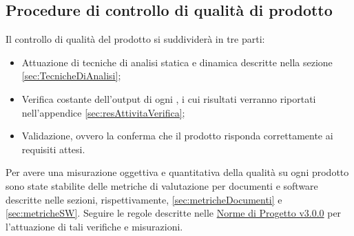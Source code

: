 \documentclass{scalatekids-article}
\begin{document}
\subsection{Procedure di controllo di qualità di prodotto}
Il controllo di qualità del prodotto si suddividerà in tre parti:
\begin{itemize}
\item{Attuazione di tecniche di analisi statica e dinamica descritte nella sezione \ref{sec:TecnicheDiAnalisi};}
\item{Verifica costante dell'output di ogni , i cui risultati verranno riportati nell'appendice \ref{sec:resAttivitaVerifica};}
\item{Validazione, ovvero la conferma che il prodotto risponda correttamente ai requisiti attesi.}
\end{itemize}
Per avere una misurazione oggettiva e quantitativa della qualità su ogni prodotto sono state stabilite delle metriche di valutazione per documenti e software descritte nelle sezioni, rispettivamente, \ref{sec:metricheDocumenti} e \ref{sec:metricheSW}. Seguire le regole descritte nelle \href{run:../Interni/NormeDiProgetto\_v3.0.0.pdf}{Norme di Progetto v3.0.0} per l'attuazione di tali verifiche e misurazioni.\\
\end{document}
